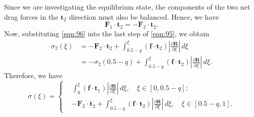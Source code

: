 \documentclass[12pt,MSc,twoside]{muthesis_2020}
\begin{document}
Since we are investigating the equilibrium state, the components of the two net drag forces in the $\mathbf{t}_2$ direction must also be balanced. Hence, we have 
\begin{equation}
	\label{eqn:96}
	\mathbf{F}_1\cdot\mathbf{t}_2=-\mathbf{F}_2\cdot\mathbf{t}_2.
\end{equation}
Now, substituting \eqref{eqn:96} into the last step of \eqref{eqn:95}, we obtain 
\begin{equation}
	\begin{aligned}
	\label{eqn:97}
\sigma_2(\xi)&=-\mathbf{F}_2\cdot\mathbf{t}_2+\int_{0.5-q}^\xi (\mathbf{f}\cdot\mathbf{t}_2) \left |\frac{\partial \mathbf{R}}{\partial \xi}\right|\,d\xi\\
&=-\sigma_2(0.5-q)+\int_{0.5-q}^\xi (\mathbf{f}\cdot\mathbf{t}_2) \left |\frac{\partial \mathbf{R}}{\partial \xi}\right|\,d\xi.
\end{aligned}
\end{equation}
Therefore, we have 
\begin{equation}
	\sigma(\xi)=\left\{
	\begin{aligned}
		\label{eqn:98}
		&\int_0^\xi (\mathbf{f}\cdot\mathbf{t}_1) \left |\frac{\partial \mathbf{R}}{\partial \xi}\right|\,d\xi,\quad \xi\in[0,0.5-q];\\
		&-\mathbf{F}_2\cdot\mathbf{t}_2+\int_{0.5-q}^\xi (\mathbf{f}\cdot\mathbf{t}_2) \left |\frac{\partial \mathbf{R}}{\partial \xi}\right|\,d\xi, \quad \xi\in[0.5-q,1].
	\end{aligned}\right.
\end{equation}
\end{document}
